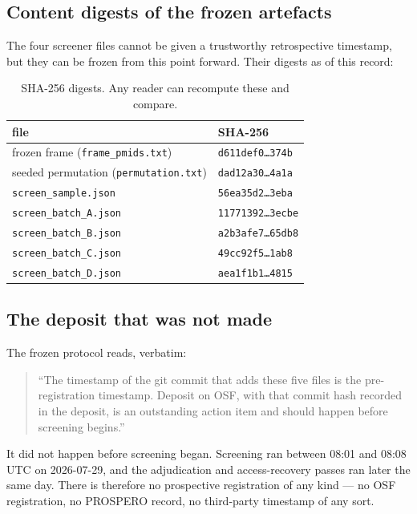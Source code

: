 \documentclass[11pt,a4paper]{article}
\begin{document}
\subsection{Content digests of the frozen artefacts}

The four screener files cannot be given a trustworthy retrospective timestamp, but they
can be frozen from this point forward. Their digests as of this record:

\begin{table}[htbp]
\centering
\caption{SHA-256 digests. Any reader can recompute these and compare.}
\small
\begin{tabular}{@{}ll@{}}
\toprule
file & SHA-256 \\
\midrule
frozen frame (\texttt{frame\_pmids.txt}) & \texttt{d611def0\ldots374b} \\
seeded permutation (\texttt{permutation.txt}) & \texttt{dad12a30\ldots4a1a} \\
\texttt{screen\_sample.json} & \texttt{56ea35d2\ldots3eba} \\
\texttt{screen\_batch\_A.json} & \texttt{11771392\ldots3ecbe} \\
\texttt{screen\_batch\_B.json} & \texttt{a2b3afe7\ldots65db8} \\
\texttt{screen\_batch\_C.json} & \texttt{49cc92f5\ldots1ab8} \\
\texttt{screen\_batch\_D.json} & \texttt{aea1f1b1\ldots4815} \\
\bottomrule
\end{tabular}
\end{table}

\subsection{The deposit that was not made}

The frozen protocol reads, verbatim:

\begin{quote}
``The timestamp of the git commit that adds these five files is the pre-registration
timestamp. Deposit on OSF, with that commit hash recorded in the deposit, is an
outstanding action item and should happen before screening begins.''
\end{quote}

It did not happen before screening began. Screening ran between 08:01 and 08:08 UTC on
2026-07-29, and the adjudication and access-recovery passes ran later the same day.
There is therefore no prospective registration of any kind --- no OSF registration, no
PROSPERO record, no third-party timestamp of any sort.
\end{document}
